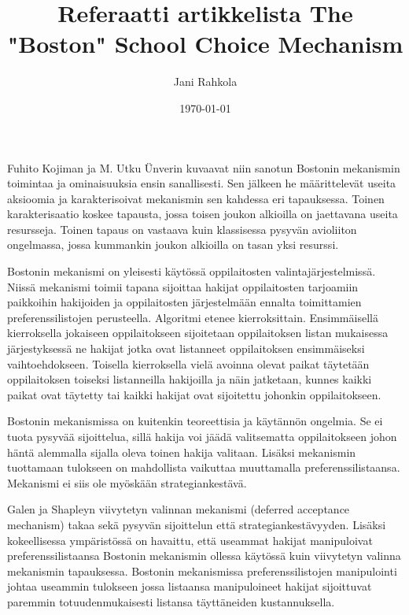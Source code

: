\documentclass{tktltiki}
\begin{document}
\title{Referaatti artikkelista The "Boston" School Choice Mechanism}
\author{Jani Rahkola}
\date{\today}

\maketitle

\doublespacing

\subject{Tietojenkäsittelytiede}


Fuhito Kojiman ja M. Utku Ünverin kuvaavat niin sanotun Bostonin
mekanismin toimintaa ja ominaisuuksia ensin sanallisesti. Sen jälkeen
he määrittelevät useita aksioomia ja karakterisoivat mekanismin sen
kahdessa eri tapauksessa. Toinen karakterisaatio koskee tapausta,
jossa toisen joukon alkioilla on jaettavana useita resursseja. Toinen
tapaus on vastaava kuin klassisessa pysyvän avioliiton ongelmassa,
jossa kummankin joukon alkioilla on tasan yksi resurssi.

Bostonin mekanismi on yleisesti käytössä oppilaitosten
valintajärjestelmissä. Niissä mekanismi toimii tapana sijoittaa
hakijat oppilaitosten tarjoamiin paikkoihin hakijoiden ja
oppilaitosten järjestelmään ennalta toimittamien preferenssilistojen
perusteella. Algoritmi etenee kierroksittain. Ensimmäisellä
kierroksella jokaiseen oppilaitokseen sijoitetaan oppilaitoksen listan
mukaisessa järjestyksessä ne hakijat jotka ovat listanneet
oppilaitoksen ensimmäiseksi vaihtoehdokseen. Toisella kierroksella
vielä avoinna olevat paikat täytetään oppilaitoksen toiseksi
listanneilla hakijoilla ja näin jatketaan, kunnes kaikki paikat ovat
täytetty tai kaikki hakijat ovat sijoitettu johonkin oppilaitokseen.

Bostonin mekanismissa on kuitenkin teoreettisia ja käytännön ongelmia.
Se ei tuota pysyvää sijoittelua, sillä hakija voi jäädä valitsematta
oppilaitokseen johon häntä alemmalla sijalla oleva toinen hakija
valitaan. Lisäksi mekanismin tuottamaan tulokseen on mahdollista
vaikuttaa muuttamalla preferenssilistaansa. Mekanismi ei siis ole
myöskään strategiankestävä.

Galen ja Shapleyn viivytetyn valinnan mekanismi (deferred acceptance
mechanism) takaa sekä pysyvän sijoittelun että strategiankestävyyden.
Lisäksi kokeellisessa ympäristössä on havaittu, että useammat hakijat
manipuloivat preferenssilistaansa Bostonin mekanismin ollessa käytössä
kuin viivytetyn valinna mekanismin tapauksessa. Bostonin mekanismissa
preferenssilistojen manipulointi johtaa useammin tulokseen jossa
listaansa manipuloineet hakijat sijoittuvat paremmin
totuudenmukaisesti listansa täyttäneiden kustannuksella.
\end{document}
